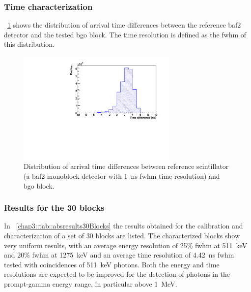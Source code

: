 \subsubsection{Time characterization}\label{chap3::subsubsec::timeChar}

\figurename~\ref{chap3::fig::abstimeDiff} shows the distribution of arrival time differences between the reference \gls{baf2} detector and the tested \gls{bgo} block. The time resolution is defined as the \gls{fwhm} of this distribution.

\begin{figure}
 \centering
  \includegraphics[width=0.7\textwidth]{03_GraphicFiles/chapter3_CLaRySproto/Absorber/images/timeDiff_distr.pdf}
  \caption{Distribution of arrival time differences between reference scintillator (a \gls{baf2} monoblock detector with 1~ns \gls{fwhm} time resolution) and \gls{bgo} block.}	
  \label{chap3::fig::abstimeDiff}
\end{figure}

\subsubsection{Results for the 30 blocks}\label{chap3::subsubsec::30blocksRes}

In \tablename~\ref{chap3::tab::absresults30Blocks} the results obtained for the calibration and characterization of a set of 30 blocks are listed.
The characterized blocks show very uniform results, with an average energy resolution of 25\% \gls{fwhm} at 511~keV and 20\% \gls{fwhm} at 1275~keV and an average time resolution of 4.42~ns \gls{fwhm} tested with coincidences of 511~keV photons. Both the energy and time resolutions are expected to be improved for the detection of photons in the prompt-gamma energy range, in particular above 1~MeV.

